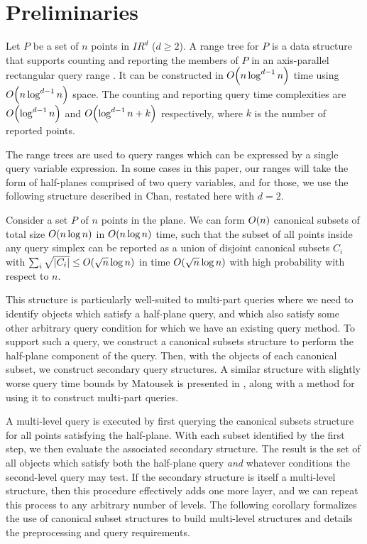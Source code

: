 \section{Preliminaries}
\label{prelim}

Let $P$ be a set of $n$ points in $I\!\!R^d$ ($d \geq 2$). A range tree for $P$ 
is a data structure that supports counting and reporting the members of $P$ in 
an axis-parallel rectangular query range
\cite[Chapter~5]{Deberg}.
It can be constructed in  $O\!\left(n \log^{d-1}{n}\right)$ time using 
$O\!\left(n \log^{d-1}{n}\right)$ space. The counting and reporting query time 
complexities are 
$O\!\left(\log^{d-1}{n}\right)$ and $O\!\left(\log^{d-1}{n} + k\right)$ respectively, where  $k$ 
is the number of reported points.

The range trees are used to query ranges which can be expressed by a single 
query variable expression.
In some cases in this paper, our ranges will take the form of half-planes 
comprised of two query variables, 
and for those, we use the following structure described in Chan\cite{chan2012}, 
restated here with $d=2$.

\begin{theorem}
\label{th:chan}
Consider a set $P$ of $n$ points in the plane. We can form $O\!\left(n\right)$ canonical subsets of total size $O\!\left(n \log{n}\right)$ in 
$O\!\left(n \log{n}\right)$ time, such that the subset of all points inside any query 
simplex can be reported as a union of disjoint canonical subsets $C_i$ with 
$\sum_i{\sqrt{|C_i|}} \leq O\!\left(\sqrt{n}\log{n}\right)$ in time 
$O\!\left(\sqrt{n}\log{n}\right)$ with high probability with respect to $n$.
\end{theorem}

This structure is particularly well-suited to multi-part queries where we need 
to identify objects which satisfy a half-plane query, 
and which also satisfy some other arbitrary query condition for which we have an 
existing query method.
To support such a query, we construct a canonical subsets structure to perform 
the half-plane component of the query. 
Then, with the objects of each canonical subset, we construct secondary query 
structures.
A similar structure with slightly worse query time bounds by 
Matousek\cite{Matousek92} is presented in \cite[Chapter~16]{Deberg}, 
along with a method for using it to construct multi-part queries.

A multi-level query is executed by first querying the canonical subsets 
structure for all points satisfying the half-plane.
With each subset identified by the first step, we then evaluate the associated 
secondary structure.
The result is the set of all objects which satisfy both the half-plane query 
\emph{and} whatever conditions the second-level query may test.
If the secondary structure is itself a multi-level structure, then this 
procedure effectively adds one more layer, and we can repeat this process to any 
arbitrary number of levels.
The following corollary formalizes the use of canonical subset structures to 
build multi-level structures and details the preprocessing and query 
requirements.


